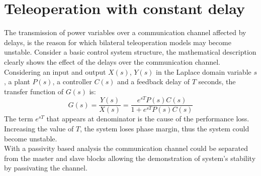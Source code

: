 \section{Teleoperation with constant delay}
The transmission of power variables over a communication channel affected by delays, is the reason for which bilateral teleoperation models may become unstable.
Consider a basic control system structure, the mathematical description clearly shows the effect of the delays over the communication channel. Considering an input and output $X(s)$, $Y(s)$ in the Laplace domain variable $s$, a plant $P(s)$, a controller $C(s)$ and a feedback delay of $T$ seconds, the transfer
function of $G(s)$ is:
\begin{equation}
	G(s) = \dfrac{Y(s)}{X(s)} = \dfrac{e^{sT}P(s)C(s)}{1+e^{sT}P(s)C(s)}
\end{equation}
The term $e^{sT}$ that appears at denominator is the cause of the performance loss. Increasing the value of $T$, the system loses phase margin, thus the system could become unstable.\\
With a passivity based analysis the communication channel could be separated from the master and slave blocks allowing the demonstration of system's stability by passivating the channel.

